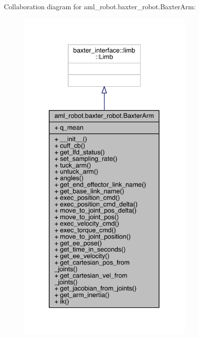 Collaboration diagram for aml\+\_\+robot.\+baxter\+\_\+robot.\+Baxter\+Arm\+:\nopagebreak
\begin{figure}[H]
\begin{center}
\leavevmode
\includegraphics[width=249pt]{classaml__robot_1_1baxter__robot_1_1_baxter_arm__coll__graph}
\end{center}
\end{figure}
